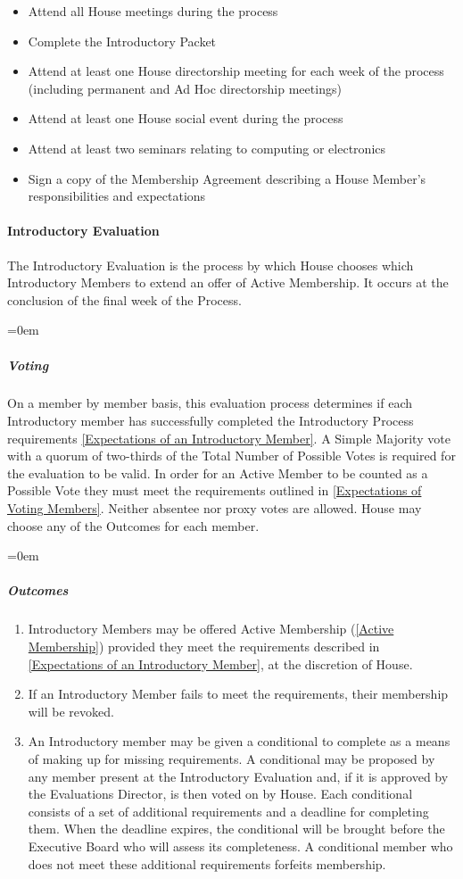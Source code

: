 \documentclass{article}
\newcommand{\asubsubsection}[1]{\paragraph{#1} \label{#1}}
\newcommand{\asubsubsubsection}[1]{\parindent=0em\subparagraph{#1} \label{#1}}
\begin{document}
\begin{itemize}
\item Attend all House meetings during the process
\item Complete the Introductory Packet
\item Attend at least one House directorship meeting for each week of the process (including permanent and Ad Hoc directorship meetings)
\item Attend at least one House social event during the process
\item Attend at least two seminars relating to computing or electronics
\item Sign a copy of the Membership Agreement describing a House Member’s responsibilities and expectations
\end{itemize}

\asubsubsection{Introductory Evaluation}
The Introductory Evaluation is the process by which House chooses which Introductory Members to extend an offer of Active Membership.
It occurs at the conclusion of the final week of the Process.

\asubsubsubsection{Voting}
On a member by member basis, this evaluation process determines if each Introductory member has successfully completed the Introductory Process requirements \ref{Expectations of an Introductory Member}.
A Simple Majority vote with a quorum of two-thirds of the Total Number of Possible Votes is required for the evaluation to be valid.
In order for an Active Member to be counted as a Possible Vote they must meet the requirements outlined in \ref{Expectations of Voting Members}.
Neither absentee nor proxy votes are allowed.
House may choose any of the Outcomes for each member.

\asubsubsubsection{Outcomes}
\renewcommand{\theenumi}{\alph{enumi}} %
\begin{enumerate}
	\item Introductory Members may be offered Active Membership (\ref{Active Membership}) provided they meet the requirements described in \ref{Expectations of an Introductory Member}, at the discretion of House.
	\item If an Introductory Member fails to meet the requirements, their membership will be revoked.
	\item An Introductory member may be given a conditional to complete as a means of making up for missing requirements.
		A conditional may be proposed by any member present at the Introductory Evaluation and, if it is approved by the Evaluations Director, is then voted on by House.
		Each conditional consists of a set of additional requirements and a deadline for completing them.
		When the deadline expires, the conditional will be brought before the Executive Board who will assess its completeness.
		A conditional member who does not meet these additional requirements forfeits membership.
\end{enumerate}
\end{document}
